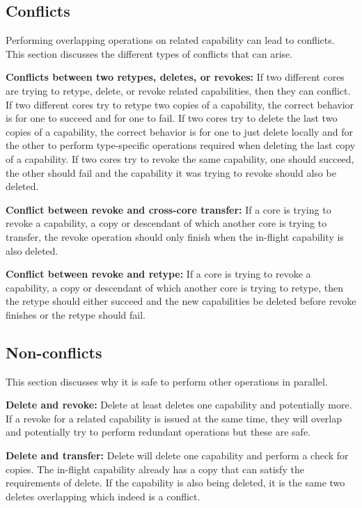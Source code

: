 \documentclass[a4paper,twoside]{report} %
\begin{document}
\subsection{Conflicts}\label{subsec:conflicts}
Performing overlapping operations on related capability can lead to
conflicts. This section discusses the different types of conflicts
that can arise.

\textbf{Conflicts between two retypes, deletes, or revokes:} If two
different cores are trying to retype, delete, or revoke related
capabilities, then they can conflict. If two different cores try to
retype two copies of a capability, the correct behavior is for one to
succeed and for one to fail. If two cores try to delete the last two
copies of a capability, the correct behavior is for one to just delete
locally and for the other to perform type-specific operations required
when deleting the last copy of a capability. If two cores try to
revoke the same capability, one should succeed, the other should fail
and the capability it was trying to revoke should also be deleted.

\textbf{Conflict between revoke and cross-core transfer:} If a core is
trying to revoke a capability, a copy or descendant of which another
core is trying to transfer, the revoke operation should only finish
when the in-flight capability is also deleted.

\textbf{Conflict between revoke and retype:} If a core is trying to
revoke a capability, a copy or descendant of which another core is
trying to retype, then the retype should either succeed and the new
capabilities be deleted before revoke finishes or the retype should
fail.

\subsection{Non-conflicts}
This section discusses why it is safe to perform other operations in
parallel.

\textbf{Delete and revoke:} Delete at least deletes one capability and
potentially more. If a revoke for a related capability is issued at
the same time, they will overlap and potentially try to perform
redundant operations but these are safe.

\textbf{Delete and transfer:} Delete will delete one capability and
perform a check for copies. The in-flight capability already has a
copy that can satisfy the requirements of delete. If the capability is
also being deleted, it is the same two deletes overlapping which
indeed is a conflict.
\end{document}
